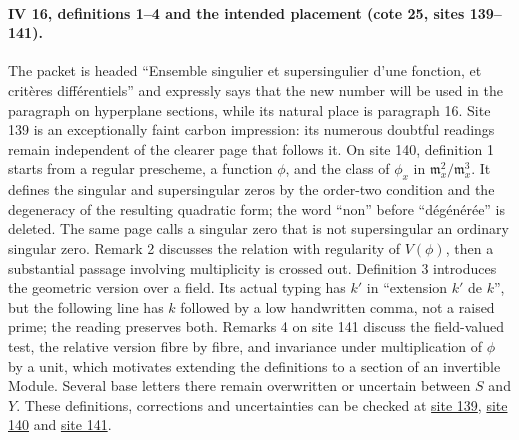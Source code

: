 \paragraph{IV 16, definitions 1--4 and the intended placement (cote 25, sites 139--141).}
The packet is headed ``Ensemble singulier et supersingulier d'une fonction, et critères différentiels'' and expressly says that the new number will be used in the paragraph on hyperplane sections, while its natural place is paragraph 16. Site 139 is an exceptionally faint carbon impression: its numerous doubtful readings remain independent of the clearer page that follows it. On site 140, definition 1 starts from a regular prescheme, a function $\phi$, and the class of $\phi_x$ in $\mathfrak m_x^2/\mathfrak m_x^3$. It defines the singular and supersingular zeros by the order-two condition and the degeneracy of the resulting quadratic form; the word ``non'' before ``dégénérée'' is deleted. The same page calls a singular zero that is not supersingular an ordinary singular zero. Remark 2 discusses the relation with regularity of $V(\phi)$, then a substantial passage involving multiplicity is crossed out. Definition 3 introduces the geometric version over a field. Its actual typing has $k'$ in ``extension $k'$ de $k$'', but the following line has $k$ followed by a low handwritten comma, not a raised prime; the reading preserves both. Remarks 4 on site 141 discuss the field-valued test, the relative version fibre by fibre, and invariance under multiplication of $\phi$ by a unit, which motivates extending the definitions to a section of an invertible Module. Several base letters there remain overwritten or uncertain between $S$ and $Y$. These definitions, corrections and uncertainties can be checked at \href{https://grothendieck.umontpellier.fr/web/viewer.html?file=../25.pdf#page=140}{site 139}, \href{https://grothendieck.umontpellier.fr/web/viewer.html?file=../25.pdf#page=141}{site 140} and \href{https://grothendieck.umontpellier.fr/web/viewer.html?file=../25.pdf#page=142}{site 141}.


